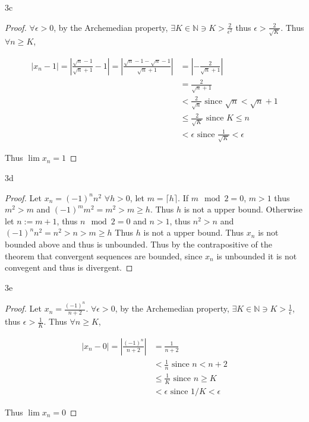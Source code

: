 \documentclass{article}
\newcommand{\N}{\mathbb{N}}
\newcommand{\abs}[1]{\left\vert #1\right \vert}
\newcommand{\ceil}[1]{\lceil{#1}\rceil}
\begin{document}
\begin{PROB}{3c}\label{Problem 3c.}
\end{PROB}
\begin{proof}
    $\forall \epsilon > 0$, by the Archemedian property, $\exists K \in \N \ni K > \frac{2}{\epsilon^2}$ thus $\epsilon > \frac{2}{\sqrt{K}}$. Thus $\forall n \geq K$, 
    
    \begin{align*}
        \abs{x_n - 1} = \abs{\frac{\sqrt{n} - 1}{\sqrt{n} + 1} - 1} = \abs{\frac{\sqrt{n} - 1 - \sqrt{n} - 1}{\sqrt{n} + 1}} &= \abs{-\frac{2}{\sqrt{n} + 1}} \\
        &= \frac{2}{\sqrt{n} + 1} \\
        &< \frac{2}{\sqrt{n}} \text{ since $\sqrt{n} < \sqrt{n} + 1$} \\
        &\leq \frac{2}{\sqrt{K}} \text{ since $K \leq n$} \\
        &< \epsilon \text{ since $\frac{1}{\sqrt{K}} < \epsilon$ }
    \end{align*}

    Thus $\lim x_n = 1$ 
\end{proof}

\begin{PROB}{3d}\label{Problem 3d.}
\end{PROB}
\begin{proof}
    Let $x_n = (-1)^n n^2$ 
    $\forall h > 0$, let $m = \ceil h$. If $m \mod 2 = 0$, $m > 1$ thus $m^2 > m$ and $(-1)^m m^2 = m^2 > m \geq h$. Thus $h$ is not a upper bound. Otherwise let $n := m + 1$, thus $n \mod 2  = 0$ and $n >1$, thus $n^2 > n$ and $(-1)^n n^2 = n^2 > n > m \geq h$ Thus $h$ is not a upper bound. Thus $x_n$ is not bounded above and thus is unbounded. Thus by the contrapositive of the theorem that convergent sequences are bounded, since $x_n$ is unbounded it is not convegent and thus is divergent.                  
\end{proof}

\begin{PROB}{3e}\label{Problem 3e.}
\end{PROB}
\begin{proof}
    Let $x_n = \frac{(-1)^n}{n + 2}$. $\forall \epsilon > 0$, by the Archemedian property, $\exists K \in \N \ni K > \frac{1}{\epsilon}$, thus $\epsilon > \frac{1}{K}$. Thus $\forall n \geq K$, 
    
    \begin{align*}
        \abs{x_n - 0} = \abs{\frac{(-1)^n}{n + 2}} &= \frac{1}{n + 2} \\
        &< \frac{1}{n} \text{ since $n < n + 2$} \\
        &\leq \frac{1}{K} \text{ since $n \geq K$ } \\
        &< \epsilon \text{ since $1/K < \epsilon$ }
    \end{align*}

    Thus $\lim x_n = 0$ 
\end{proof}
\end{document}
